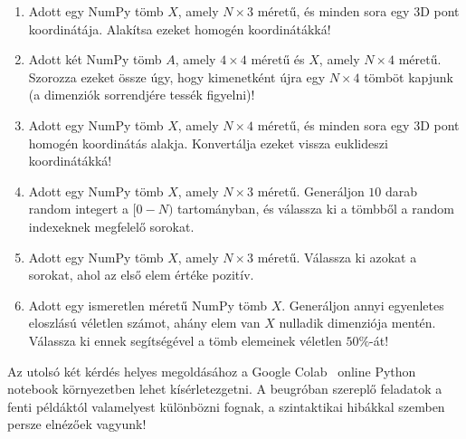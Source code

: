 \documentclass[12pt,a4paper,oneside]{report}             %
\begin{document}
\begin{enumerate}
\begin{enumerate}
		\item Adott egy NumPy tömb $X$, amely $N\times 3$ méretű, és minden sora egy 3D pont koordinátája. Alakítsa ezeket homogén koordinátákká!
		\item Adott két NumPy tömb $A$, amely $4\times 4$ méretű és $X$, amely $N\times 4$ méretű. Szorozza ezeket össze úgy, hogy kimenetként újra egy $N\times 4$ tömböt kapjunk (a dimenziók sorrendjére tessék figyelni)!
		\item Adott egy NumPy tömb $X$, amely $N\times 4$ méretű, és minden sora egy 3D pont homogén koordinátás alakja. Konvertálja ezeket vissza euklideszi koordinátákká!
		\item Adott egy NumPy tömb $X$, amely $N\times 3$ méretű. Generáljon $10$ darab random integert a $[0-N)$ tartományban, és válassza ki a tömbből a random indexeknek megfelelő sorokat.
		\item Adott egy NumPy tömb $X$, amely $N\times 3$ méretű. Válassza ki azokat a sorokat, ahol az első elem értéke pozitív.
		\item Adott egy ismeretlen méretű NumPy tömb $X$. Generáljon annyi egyenletes eloszlású véletlen számot, ahány elem van $X$ nulladik dimenziója mentén. Válassza ki ennek segítségével a tömb elemeinek véletlen $50\%$-át!
		
	\end{enumerate}
\end{enumerate}

Az utolsó két kérdés helyes megoldásához a Google Colab~\cite{colab} online Python notebook környezetben lehet kísérletezgetni. A beugróban szereplő feladatok a fenti példáktól valamelyest különbözni fognak, a szintaktikai hibákkal szemben persze elnézőek vagyunk!

\printbibliography
\end{document}
